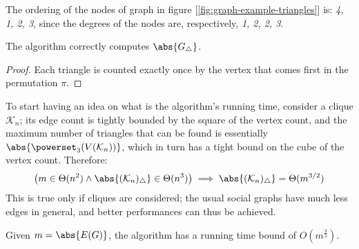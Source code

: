\begin{example}
    The ordering of the nodes of graph in figure [\ref{fig:graph-example-triangles}] is: \textit{4, 1, 2, 3}, since the degrees of the nodes are, respectively, \textit{1, 2, 2, 3}.
\end{example}

\begin{claim}\label{thm:triangles-2}
    The algorithm correctly computes $\abs{G_\triangle}$.
\end{claim}

\begin{proof}
    Each triangle is counted exactly once by the vertex that comes first in the permutation $\pi$.
\end{proof}

To start having an idea on what is the algorithm's running time, consider a clique $\mathcal{K}_n$; its edge count is tightly bounded by the square of the vertex count, and the maximum number of triangles that can be found is essentially $\abs{\powerset_3(V(\mathcal{K}_n))}$, which in turn has a tight bound on the cube of the vertex count. Therefore:
\[
    \left( m \in \Theta(n^2) \wedge \abs{(\mathcal{K}_n)_\triangle} \in \Theta(n^3) \right) \implies \abs{(\mathcal{K}_n)_\triangle} = \Theta(m^{3/2})
\]
This is true only if cliques are considered; the usual social graphs have much less edges in general, and better performances can thus be achieved.

\begin{theorem}\label{thm:triangles-3}
    Given $m = \abs{E(G)}$, the algorithm has a running time bound of $O(m^{\frac{3}{2}})$.
\end{theorem}



